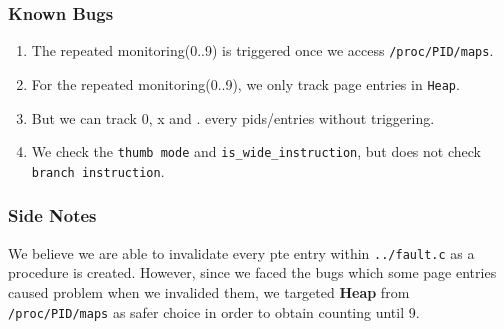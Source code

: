 \documentclass[]{article}
\begin{document}
\subsubsection{Known Bugs}\label{Known Bugs}
\begin{enumerate}
\item The repeated monitoring(0..9) is triggered once we access \texttt{/proc/PID/maps}.
\item For the repeated monitoring(0..9), we only track page entries in \texttt{Heap}.
\item But we can track 0, x and . every pids/entries without triggering.
\item We check the \texttt{thumb mode} and \texttt{is\_wide\_instruction}, but does not check \texttt{branch instruction}.
\end{enumerate}

\subsubsection{Side Notes}\label{Side Notes}
We believe we are able to invalidate every pte entry within \texttt{../fault.c} as a procedure is created. However, since we faced the bugs which some page entries caused problem when we invalided them, we targeted \textbf{Heap} from  \texttt{/proc/PID/maps} as safer choice in order to obtain counting until 9.
\end{document}
